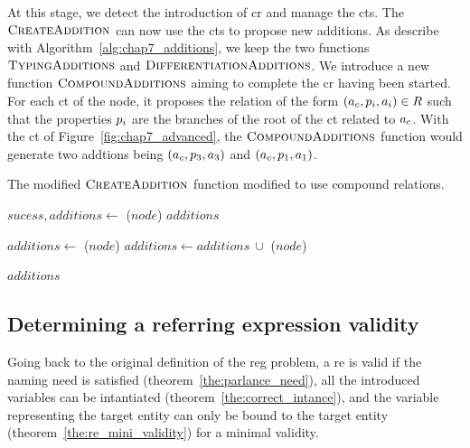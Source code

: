At this stage, we detect the introduction of \acrshort{cr} and manage the \acrshort{ct}s. The $\textsc{CreateAddition}$ can now use the \acrshort{ct}s to propose new additions. As describe with Algorithm~\ref{alg:chap7_additions}, we keep the two functions $\textsc{TypingAdditions}$ and $\textsc{DifferentiationAdditions}$. We introduce a new function $\textsc{CompoundAdditions}$ aiming to complete the \acrshort{cr} having been started. For each \acrshort{ct} of the node, it proposes the relation of the form $(a_c, p_i, a_i) \in R$ such that the properties $p_i$ are the branches of the root of the \acrshort{ct} related to $a_c$. With the  \acrshort{ct} of Figure~\ref{fig:chap7_advanced}, the $\textsc{CompoundAdditions}$ function would generate two addtions being $(a_c, p_3, a_3)$ and $(a_c, p_1, a_1)$.

\begin{algorithm}[ht!]
\caption{\label{alg:chap7_additions} The modified $\textsc{CreateAddition}$ function modified to use compound relations. }

\begin{algorithmic}

        \State $sucess, additions\leftarrow$ \typingadditions($node$)
            \Return $additions$
        \EndIf
        
        \State $additions\leftarrow$ \compoundadditions($node$) 
        \State $additions\leftarrow additions\ \cup$ \differenceadditions($node$) 
        
        \Return $additions$
    \EndFunction
    
\end{algorithmic}
\end{algorithm}

\subsection{Determining a referring expression validity}

Going back to the original definition of the \acrshort{reg} problem, a \acrshort{re} is valid if the naming need is satisfied (theorem~\ref{the:parlance_need}), all the introduced variables can be intantiated (theorem~\ref{the:correct_intance}), and the variable representing the target entity can only be bound to the target entity (theorem~\ref{the:re_mini_validity}) for a minimal validity.

